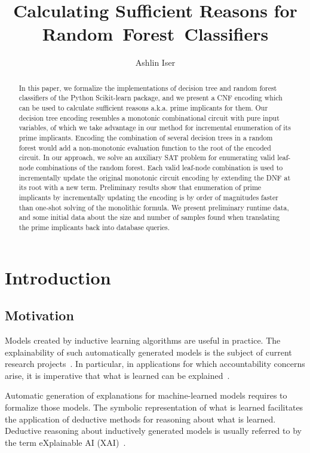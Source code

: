 \documentclass{easychair}
\title{Calculating Sufficient Reasons for Random~Forest~Classifiers}
\author{Ashlin Iser}
\institute {
Algorithm Engineering, Institute of Theoretical Informatics, KIT-Department of Informatics, Karlsruhe Institute of Technology (KIT), Germany
}
\theoremstyle{definition}
\begin{document}
\maketitle
\begin{abstract}
In this paper, we formalize the implementations of decision tree and random forest classifiers of the Python Scikit-learn package, and we present a CNF encoding which can be used to calculate sufficient reasons a.k.a. prime implicants for them. 
Our decision tree encoding resembles a monotonic combinational circuit with pure input variables, of which we take advantage in our method for incremental enumeration of its prime implicants. 
Encoding the combination of several decision trees in a random forest would add a non-monotonic evaluation function to the root of the encoded circuit. 
In our approach, we solve an auxiliary SAT problem for enumerating valid leaf-node combinations of the random forest. 
Each valid leaf-node combination is used to incrementally update the original monotonic circuit encoding by extending the DNF at its root with a new term. 
Preliminary results show that enumeration of prime implicants by incrementally updating the encoding is by order of magnitudes faster than one-shot solving of the monolithic formula. 
We present preliminary runtime data, and some initial data about the size and number of samples found when translating the prime implicants back into database queries. 
\end{abstract}


\section{Introduction}

\subsection{Motivation}

Models created by inductive learning algorithms are useful in practice.
The explainability of such automatically generated models is the subject of current research projects~\cite{Audemard:2021:Intelligibility, Darwiche:2020:Reasons}.
In particular, in applications for which accountability concerns arise, it is imperative that what is learned can be explained~\cite{Percy:2021:Accountability}. 

Automatic generation of explanations for machine-learned models requires to formalize those models. 
The symbolic representation of what is learned facilitates the application of deductive methods for reasoning about what is learned.
Deductive reasoning about inductively generated models is usually referred to by the term eXplainable AI (XAI)~\cite{Arrieta:2019:XAI}. 
\end{document}
